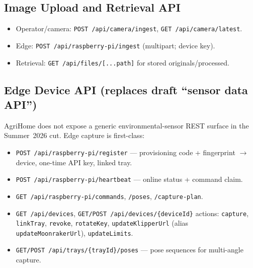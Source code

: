 \documentclass[11pt,letterpaper]{article}
\begin{document}
\subsection{Image Upload and Retrieval API}
\begin{itemize}
  \item Operator/camera: \texttt{POST /api/camera/ingest}, \texttt{GET /api/camera/latest}.
  \item Edge: \texttt{POST /api/raspberry-pi/ingest} (multipart; device key).
  \item Retrieval: \texttt{GET /api/files/[...path]} for stored originals/processed.
\end{itemize}

\subsection{Edge Device API (replaces draft ``sensor data API'')}
AgriHome does not expose a generic environmental-sensor REST surface in the Summer~2026 cut.
Edge capture is first-class:

\begin{itemize}
  \item \texttt{POST /api/raspberry-pi/register} --- provisioning code + fingerprint $\rightarrow$
        device, one-time API key, linked tray.
  \item \texttt{POST /api/raspberry-pi/heartbeat} --- online status + command claim.
  \item \texttt{GET /api/raspberry-pi/commands}, \texttt{/poses}, \texttt{/capture-plan}.
  \item \texttt{GET /api/devices}, \texttt{GET/POST /api/devices/\{deviceId\}} actions:
        \texttt{capture}, \texttt{linkTray}, \texttt{revoke}, \texttt{rotateKey},
        \texttt{updateKlipperUrl} (alias \texttt{updateMoonrakerUrl}), \texttt{updateLimits}.
  \item \texttt{GET/POST /api/trays/\{trayId\}/poses} --- pose sequences for multi-angle capture.
\end{itemize}
\end{document}
